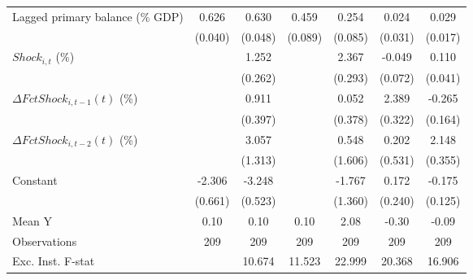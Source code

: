 {\begin{tabular}{l*{6}{c}}
\addlinespace
Lagged primary balance (\% GDP)&       0.626\sym{***}&       0.630\sym{***}&       0.459\sym{***}&       0.254\sym{**} &       0.024         &       0.029         \\
                    &     (0.040)         &     (0.048)         &     (0.089)         &     (0.085)         &     (0.031)         &     (0.017)         \\
\addlinespace
$ Shock_{i,t}$ (\%) &                     &       1.252\sym{***}&                     &       2.367\sym{***}&      -0.049         &       0.110\sym{**} \\
                    &                     &     (0.262)         &                     &     (0.293)         &     (0.072)         &     (0.041)         \\
\addlinespace
$ \Delta FctShock_{i,t-1}(t)$ (\%)&                     &       0.911\sym{**} &                     &       0.052         &       2.389\sym{***}&      -0.265         \\
                    &                     &     (0.397)         &                     &     (0.378)         &     (0.322)         &     (0.164)         \\
\addlinespace
$ \Delta FctShock_{i,t-2}(t)$ (\%)&                     &       3.057\sym{**} &                     &       0.548         &       0.202         &       2.148\sym{***}\\
                    &                     &     (1.313)         &                     &     (1.606)         &     (0.531)         &     (0.355)         \\
\addlinespace
Constant            &      -2.306\sym{***}&      -3.248\sym{***}&                     &      -1.767         &       0.172         &      -0.175         \\
                    &     (0.661)         &     (0.523)         &                     &     (1.360)         &     (0.240)         &     (0.125)         \\
\midrule
Mean Y              &        0.10         &        0.10         &        0.10         &        2.08         &       -0.30         &       -0.09         \\
Observations        &         209         &         209         &         209         &         209         &         209         &         209         \\
Exc. Inst. F-stat   &                     &      10.674         &      11.523         &      22.999         &      20.368         &      16.906         \\
\bottomrule
\end{tabular}
}
